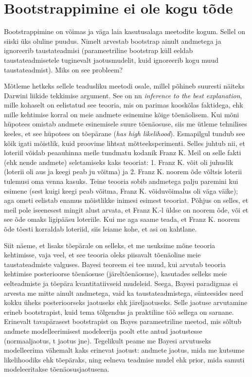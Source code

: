 \documentclass[]{book}
\begin{document}
\hypertarget{bootstrappimine-ei-ole-kogu-tode}{%
\section*{Bootstrappimine ei ole kogu tõde}\label{bootstrappimine-ei-ole-kogu-tode}}

Bootstrappimine on võimas ja väga laia kasutusalaga meetodite kogum. Sellel on siiski üks oluline puudus. Nimelt arvestab bootstrap ainult andmetega ja ignoreerib taustateadmisi (parameetriline bootstrap küll eeldab taustateadmisetele tuginevalt jaotusmudelit, kuid ignoreerib kogu muud taustateadmist). Miks on see probleem?

Mõtleme hetkeks sellele teadusliku meetodi osale, millel põhineb suuresti näiteks Darwini liikide tekkimise argument. See on nn \emph{inference to the best explanation}, mille kohaselt on eelistatud see teooria, mis on parimas kooskõlas faktidega, ehk mille kehtimise korral on meie andmete esinemine kõige tõenäolisem. Kui mõni hüpotees omistab andmete esinemisele suure tõenäosuse, siis me ütleme tehnilises keeles, et see hüpotees on tõepärane (\emph{has high likelihood}). Esmapilgul tundub see kõik igati mõistlik, kuid proovime lihtsat mõtteeksperimenti. Selles juhtub nii, et loteriil võidab peaauhinna meile tundmatu kodanik Franz K. Meil on selle fakti (ehk nende andmete) seletamiseks kaks teooriat: 1. Franz K. võit oli juhuslik (loterii oli aus ja keegi peab ju võitma) ja 2. Franz K. noorem õde võltsis loterii tulemusi oma venna kasuks. Teine teooria sobib andmetega palju paremini kui esimene (sest kuigi keegi peab võitma, Franz K. võiduvõimalus oli väga väike); aga ometi eelistab enamus mõistlikke inimesi esimest teooriat. Põhjus on selles, et meil pole iseenesest mingit alust arvata, et Franz K.-l üldse on noorem õde, või et see õde omaks ligipääsu loteriile. Kui me aga saame teada, et Franz K. noorem õde tõesti korraldab loteriid, siis leiame kohe, et asi on kahtlane.

Siit näeme, et lisaks tõepärale on selleks, et me usuksime mõne teooria kehtimisse, vaja veel, et see teooria oleks piisavalt tõenäoline meie taustateadmiste valguses. Bayesi teoreem ei tee muud, kui arvutab teooria kehtimise posterioorse tõenäosuse (järeltõenäosuse), kasutades selleks meie eelteadmiste ja tõepära kvantitatiivseid mudeleid.
Seega, Bayesi paradigmas ei arvesta me mitte ainult andmetega, vaid ka taustateadmistega, sünteesides need kokku üheks posterioorseks jaotuseks ehk järeljaotuseks. Selle jaotuse arvutamine erineb bootstrapist, kuid tema tõlgendus ja praktiline töö sellega on sarnane. Erinevalt tavapärasest bootstrapist on Bayes parameetriline meetod, mis sõltub andmete modelleerimisest modeleerija poolt ette antud jaotustesse (normaaljaotus, t jaotus jne). Tegelikult peame me Bayesi arvutuseks modelleerima vähemalt kaks erinevat jaotust: andmete jaotus, mida me kutsume likelihoodiks ehk tõepäraks, ning eelneva teadmise mudel ehk prior, mida samuti modeleeritakse tõenäosusjaotusena.
\end{document}
